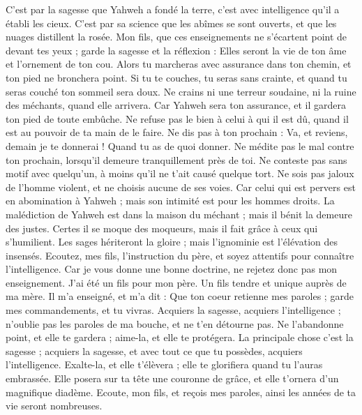 \begin{multicols}{2}
C’est par la sagesse que Yahweh a fondé la terre, c’est avec intelligence qu’il a établi les cieux.
C’est par sa science que les abîmes se sont ouverts, et que les nuages distillent la rosée.
Mon fils, que ces enseignements ne s'écartent point de devant tes yeux ; garde la sagesse et la réflexion :
Elles seront la vie de ton âme et l'ornement de ton cou.
Alors tu marcheras avec assurance dans ton chemin, et ton pied ne bronchera point.
Si tu te couches, tu seras sans crainte, et quand tu seras couché ton sommeil sera doux.
Ne crains ni une terreur soudaine, ni la ruine des méchants, quand elle arrivera.
Car Yahweh sera ton assurance, et il gardera ton pied de toute embûche.
Ne refuse pas le bien à celui à qui il est dû, quand il est au pouvoir de ta main de le faire.
Ne dis pas à ton prochain : Va, et reviens, demain je te donnerai ! Quand tu as de quoi donner.
Ne médite pas le mal contre ton prochain, lorsqu’il demeure tranquillement près de toi.
Ne conteste pas sans motif avec quelqu’un, à moins qu'il ne t'ait causé quelque tort.
Ne sois pas jaloux de l'homme violent, et ne choisis aucune de ses voies.
Car celui qui est pervers est en abomination à Yahweh ; mais son intimité est pour les hommes droits.
La malédiction de Yahweh est dans la maison du méchant ; mais il bénit la demeure des justes.
Certes il se moque des moqueurs, mais il fait grâce à ceux qui s’humilient.
Les sages hériteront la gloire ; mais l'ignominie est l’élévation des insensés.
\VerseOne{}Ecoutez, mes fils, l'instruction du père, et soyez attentifs pour connaître l'intelligence.
Car je vous donne une bonne doctrine, ne rejetez donc pas mon enseignement.
J’ai été un fils pour mon père. Un fils tendre et unique auprès de ma mère.
Il m'a enseigné, et m'a dit : Que ton coeur retienne mes paroles ; garde mes commandements, et tu vivras.
Acquiers la sagesse, acquiers l’intelligence ; n’oublie pas les paroles de ma bouche, et ne t’en détourne pas.
Ne l'abandonne point, et elle te gardera ; aime-la, et elle te protégera.
La principale chose c'est la sagesse ; acquiers la sagesse, et avec tout ce que tu possèdes, acquiers l’intelligence.
Exalte-la, et elle t'élèvera ; elle te glorifiera quand tu l'auras embrassée.
Elle posera sur ta tête une couronne de grâce, et elle t’ornera d’un magnifique diadème.
Ecoute, mon fils, et reçois mes paroles, ainsi les années de ta vie seront nombreuses.

\end{multicols}
